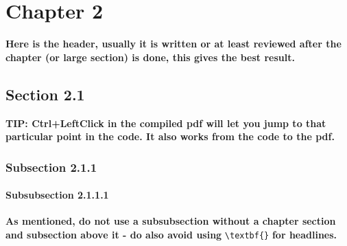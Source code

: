 \chapter{Chapter 2}
\textbf{Here is the header, usually it is written or at least reviewed after the chapter (or large section) is done, this gives the best result.}\\
\lipsum[8]
\section{Section 2.1} %
\lipsum[2]
\textbf{TIP: Ctrl+LeftClick in the compiled pdf will let you jump to that particular point in the code. It also works from the code to the pdf.}
\subsection{Subsection 2.1.1}
\lipsum[5]
\subsubsection{Subsubsection 2.1.1.1}
\textbf{As mentioned, do not use a subsubsection without a chapter section and subsection above it - do also avoid using} \verb|\textbf{}| \textbf{for headlines.}\\